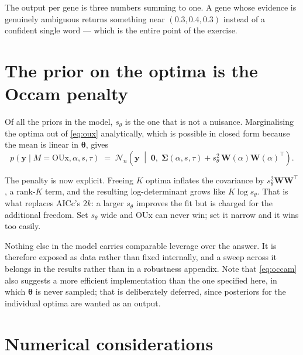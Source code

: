 \documentclass[11pt]{article}
\newcommand{\yv}{\mathbf{y}}
\newcommand{\Wm}{\mathbf{W}}
\newcommand{\thetav}{\boldsymbol{\theta}}
\newcommand{\Sig}{\boldsymbol{\Sigma}}
\newcommand{\OUx}{\mathrm{OUx}}
\begin{document}
The output per gene is three numbers summing to one. A gene whose evidence is genuinely ambiguous
returns something near $(0.3, 0.4, 0.3)$ instead of a confident single word --- which is the entire
point of the exercise.

\section{The prior on the optima is the Occam penalty}
\label{sec:occam}

Of all the priors in the model, $s_{\theta}$ is the one that is not a nuisance. Marginalising the
optima out of \eqref{eq:oux} analytically, which is possible in closed form because the mean is
linear in $\thetav$, gives
\begin{equation}
p(\yv \mid M = \OUx, \alpha, s, \tau) \;=\; \mathcal{N}_{n}\!\left(\yv \;\middle|\; \mathbf{0},\;
   \Sig(\alpha, s, \tau) + s_{\theta}^{2}\,\Wm(\alpha)\Wm(\alpha)^{\!\top}\right).
\label{eq:occam}
\end{equation}

The penalty is now explicit. Freeing $K$ optima inflates the covariance by $s_{\theta}^{2}\Wm\Wm^{\top}$,
a rank-$K$ term, and the resulting log-determinant grows like $K \log s_{\theta}$. That is what
replaces AICc's $2k$: a larger $s_{\theta}$ improves the fit but is charged for the additional freedom.
Set $s_{\theta}$ wide and $\OUx$ can never win; set it narrow and it wins too easily.

Nothing else in the model carries comparable leverage over the answer. It is therefore exposed as
data rather than fixed internally, and a sweep across it belongs in the results rather than in a
robustness appendix. Note that \eqref{eq:occam} also suggests a more efficient implementation than
the one specified here, in which $\thetav$ is never sampled; that is deliberately deferred, since
posteriors for the individual optima are wanted as an output.

\section{Numerical considerations}
\end{document}
